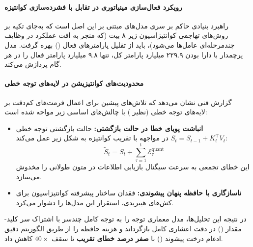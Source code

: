 \item {}

\paragraph*{رویکرد فعال‌سازی مینیاتوری در تقابل با فشرده‌سازی کوانتیزه}
راهبرد بنیادی حاکم بر سری مدل‌های  \cite{minimax2026m2} مبتنی بر این اصل است که به‌جای تکیه بر روش‌های تهاجمی کوانتیزاسیون زیر ۸ بیت (که منجر به افت عملکرد در وظایف چندمرحله‌ای عامل‌ها می‌شود)، باید از تقلیل پارامترهای فعال () بهره گرفت. مدل پرچمدار  با دارا بودن ۲۲۹.۹ میلیارد پارامتر کل، تنها ۹.۸ میلیارد پارامتر فعال را در هر گام پردازش می‌کند.

\paragraph*{محدودیت‌های کوانتیزیشن در لایه‌های توجه خطی}
گزارش فنی  نشان می‌دهد که تلاش‌های پیشین برای اعمال فرمت‌های کم‌دقت بر لایه‌های توجه خطی (نظیر ) با چالش‌های اساسی زیر مواجه شده است:
\begin{itemize}
    \item \textbf{انباشت پویای خطا در حالت بازگشتی:} حالت بازگشتی توجه خطی $S_t = S_{t-1} + K_t^\top V_t$ در مواجهه با تقریب کوانتیزه به شکل زیر عمل می‌کند:
    \begin{equation}
        \tilde{S}_t = S_t + \sum_{\tau=1}^{t} \mathcal{E}_\tau^{\text{quant}}
    \end{equation}
    این خطای تجمعی به سرعت سیگنال بازیابی اطلاعات در متون طولانی را مخدوش می‌سازد.
    \item \textbf{ناسازگاری با حافظه پنهان پیشوندی:} فقدان ساختار پیشرفته کوانتیزاسیون برای کش‌های هیبریدی، استقرار این مدل‌ها را دشوار می‌کرد.
\end{itemize}
در نتیجه این تحلیل‌ها، مدل  معماری توجه را به توجه کامل چندسر با اشتراک سر کلید-مقدار () در دقت اعشاری کامل بازگرداند و هزینه حافظه را از طریق الگوریتم دقیق ادغام درخت پیشوند () با \textbf{صفر درصد خطای تقریب} تا سقف $40\times$ کاهش داد.


